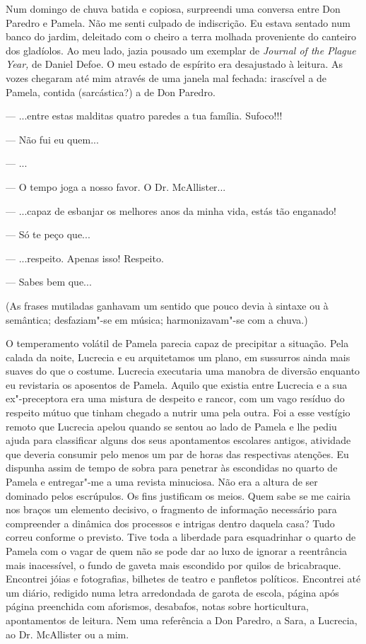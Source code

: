 Num domingo de chuva batida e copiosa, surpreendi uma conversa entre Don
Paredro e Pamela. Não me senti culpado de indiscrição. Eu estava sentado
num banco do jardim, deleitado com o cheiro a terra molhada
proveniente do canteiro dos gladíolos. Ao meu lado, jazia pousado um
exemplar de \emph{Journal of the Plague Year, }de Daniel Defoe. O meu
estado de espírito era desajustado à leitura. As vozes chegaram até mim
através de uma janela mal fechada: irascível a de Pamela, contida
(sarcástica?) a de Don Paredro.

--- ...entre estas malditas quatro paredes a tua família.
Sufoco!!!

--- Não fui eu quem...

--- ...

--- O tempo joga a nosso favor. O Dr. McAllister...

--- ...capaz de esbanjar os melhores anos da minha vida, estás tão
  enganado!

--- Só te peço que...

--- ...respeito. Apenas isso! Respeito.

--- Sabes bem que...

(As frases mutiladas ganhavam um sentido que pouco devia à sintaxe ou
à semântica; desfaziam"-se em música; harmonizavam"-se com a chuva.)

O temperamento volátil de Pamela parecia capaz de precipitar a
situação. Pela calada da noite, Lucrecia e eu arquitetamos um plano,
em sussurros ainda mais suaves do que o costume. Lucrecia executaria uma
manobra de diversão enquanto eu revistaria os aposentos de Pamela.
Aquilo que existia entre Lucrecia e a sua ex"-preceptora era uma mistura
de despeito e rancor, com um vago resíduo do respeito mútuo que tinham
chegado a nutrir uma pela outra. Foi a esse vestígio remoto que Lucrecia
apelou quando se sentou ao lado de Pamela e lhe pediu ajuda para
classificar alguns dos seus apontamentos escolares antigos, atividade
que deveria consumir pelo menos um par de horas das respectivas
atenções. Eu dispunha assim de tempo de sobra para penetrar às escondidas no quarto de Pamela e entregar"-me a uma revista minuciosa. Não
era a altura de ser dominado pelos escrúpulos. Os fins justificam os
meios. Quem sabe se me cairia nos braços um elemento decisivo, o
fragmento de informação necessário para compreender a dinâmica dos
processos e intrigas dentro daquela casa? Tudo correu conforme o
previsto. Tive toda a liberdade para esquadrinhar o quarto de Pamela com
o vagar de quem não se pode dar ao luxo de ignorar a reentrância mais
inacessível, o fundo de gaveta mais escondido por quilos de
bricabraque. Encontrei jóias e fotografias, bilhetes de teatro e
panfletos políticos. Encontrei até um diário, redigido numa letra
arredondada de garota de escola, página após página preenchida com
aforismos, desabafos, notas sobre horticultura, apontamentos de
leitura. Nem uma referência a Don Paredro, a Sara, a Lucrecia, ao Dr.
McAllister ou a mim.

